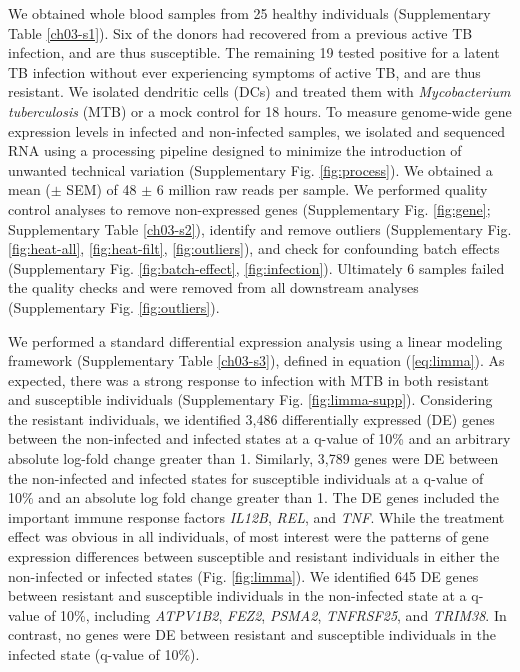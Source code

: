 We obtained whole blood samples from 25 healthy individuals
(Supplementary Table \ref{ch03-s1}). Six of the donors had recovered from a
previous active TB infection, and are thus susceptible. The remaining
19 tested positive for a latent TB infection without ever experiencing
symptoms of active TB, and are thus resistant. We isolated dendritic
cells (DCs) and treated them with \emph{Mycobacterium
}\emph{tuberculosis} (MTB) or a mock control for 18 hours. To measure
genome-wide gene expression levels in infected and non-infected
samples, we isolated and sequenced RNA using a processing pipeline
designed to minimize the introduction of unwanted technical variation
(Supplementary Fig. \ref{fig:process}). We obtained a mean ($\pm$ SEM)
of 48 $\pm$ 6 million raw reads per sample. We performed quality
control analyses to remove non-expressed genes (Supplementary Fig.
\ref{fig:gene}; Supplementary Table \ref{ch03-s2}), identify and remove outliers
(Supplementary Fig. \ref{fig:heat-all}, \ref{fig:heat-filt},
\ref{fig:outliers}), and check for confounding batch effects
(Supplementary Fig. \ref{fig:batch-effect}, \ref{fig:infection}). Ultimately
6 samples failed the quality checks and were removed from all
downstream analyses (Supplementary Fig. \ref{fig:outliers}).

We performed a standard differential expression analysis using a
linear modeling framework (Supplementary Table \ref{ch03-s3}), defined in equation
(\ref{eq:limma}). As expected, there was a strong response to
infection with MTB in both resistant and susceptible individuals
(Supplementary Fig. \ref{fig:limma-supp}). Considering the resistant
individuals, we identified 3,486 differentially expressed (DE) genes
between the non-infected and infected states at a q-value of 10\% and
an arbitrary absolute log-fold change greater than 1. Similarly, 3,789
genes were DE between the non-infected and infected states for
susceptible individuals at a q-value of 10\% and an absolute log fold
change greater than 1. The DE genes included the important immune
response factors \emph{IL12B}, \emph{REL}, and \emph{TNF}. While the
treatment effect was obvious in all individuals, of most interest were
the patterns of gene expression differences between susceptible and
resistant individuals in either the non-infected or infected states
(Fig. \ref{fig:limma}). We identified 645 DE genes between resistant
and susceptible individuals in the non-infected state at a q-value of
10\%, including \emph{ATPV1B2}, \emph{FEZ2}, \emph{PSMA2},
\emph{TNFRSF25}, and \emph{TRIM38}. In contrast, no genes were DE
between resistant and susceptible individuals in the infected state
(q-value of 10\%).

